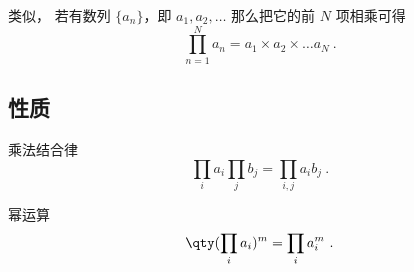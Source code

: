 
\begin{issues}
\issueDraft
\end{issues}

类似， 若有数列 $\{a_n\}$，即 $a_1, a_2, \dots$ 那么把它的前 $N$ 项相乘可得
\begin{equation}
\prod_{n = 1}^N a_n = a_1\times a_2\times \dots a_N~.
\end{equation}

\subsection{性质}
乘法结合律
\begin{equation}
\prod_i a_i \prod_j b_j =  \prod_{i,j} a_i b_j~.
\end{equation}

幂运算
\begin{equation}
\qty(\prod_i a_i)^m =  \prod_i a_i^m~.
\end{equation}
